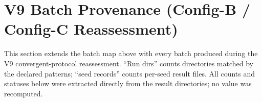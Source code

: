 
\section{V9 Batch Provenance (Config-B / Config-C Reassessment)}

This section extends the batch map above with every batch produced during the V9 convergent-protocol reassessment. ``Run dirs'' counts directories matched by the declared patterns; ``seed records'' counts per-seed result files. All counts and statuses below were extracted directly from the result directories; no value was recomputed.

